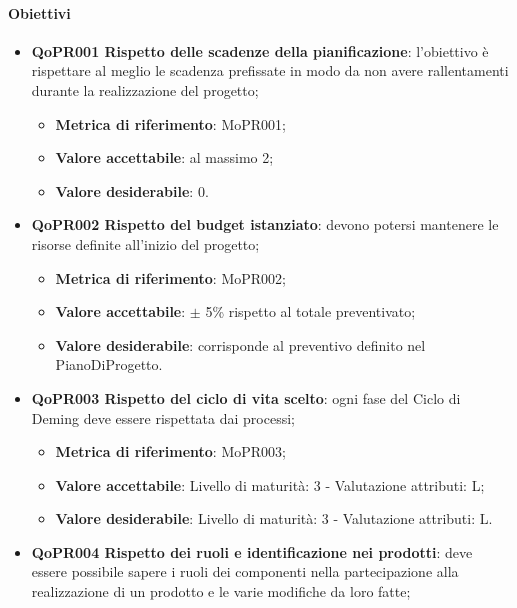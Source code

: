 \documentclass[../piano-di-qualifica.tex]{subfiles}
\begin{document}
\paragraph{Obiettivi}
\label{sub:obiettivi_1}
\begin{itemize}
    \item \textbf{QoPR001 Rispetto delle scadenze della pianificazione}: l'obiettivo è rispettare al meglio le scadenza prefissate in modo da non avere rallentamenti durante la realizzazione del progetto;
        \begin{itemize}
            \item \textbf{Metrica di riferimento}: MoPR001;
            \item \textbf{Valore accettabile}: al massimo 2; %
            \item \textbf{Valore desiderabile}: 0.
        \end{itemize}
    \item \textbf{QoPR002 Rispetto del budget istanziato}: devono potersi mantenere le risorse definite all'inizio del progetto;
        \begin{itemize}
            \item \textbf{Metrica di riferimento}: MoPR002;
            \item \textbf{Valore accettabile}: $\pm$ 5\% rispetto al totale preventivato; %
            \item \textbf{Valore desiderabile}: corrisponde al preventivo definito nel PianoDiProgetto.
        \end{itemize}
    \item \textbf{QoPR003 Rispetto del ciclo di vita scelto}: ogni fase del Ciclo di Deming deve essere rispettata dai processi;
        \begin{itemize}
            \item \textbf{Metrica di riferimento}: MoPR003;
            \item \textbf{Valore accettabile}: Livello di maturità: 3 - Valutazione attributi: L; %
            \item \textbf{Valore desiderabile}: Livello di maturità: 3 - Valutazione attributi: L.
        \end{itemize}
    \item \textbf{QoPR004 Rispetto dei ruoli e identificazione nei prodotti}: deve essere possibile sapere i ruoli dei componenti nella partecipazione alla realizzazione di un prodotto e le varie modifiche da loro fatte;

\end{itemize}
\end{document}
